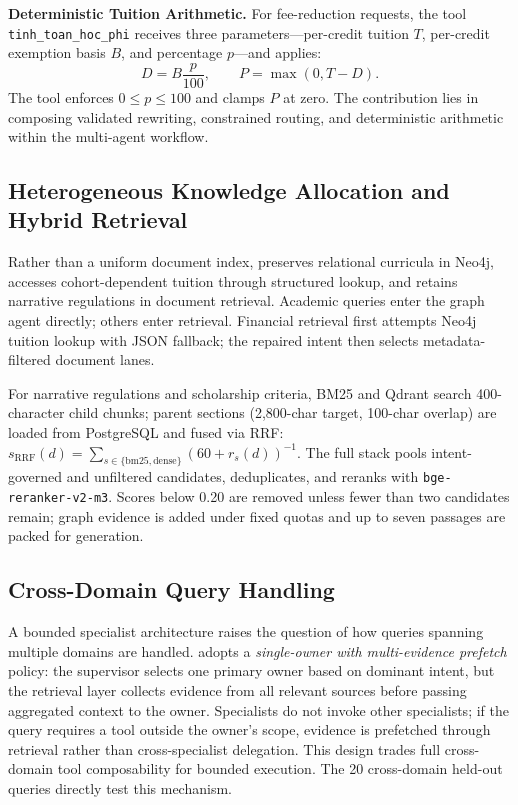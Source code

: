 \textbf{Deterministic Tuition Arithmetic.}
For fee-reduction requests, the tool \texttt{tinh\_}\allowbreak\texttt{toan\_}\allowbreak\texttt{hoc\_}\allowbreak\texttt{phi} receives three parameters---per-credit tuition $T$, per-credit exemption basis $B$, and percentage $p$---and applies:
\begin{equation}
  D = B\frac{p}{100}, \qquad P = \max(0, T-D).
  \label{eq:tuition_reduction}
\end{equation}
The tool enforces $0 \le p \le 100$ and clamps $P$ at zero. The contribution lies in composing validated rewriting, constrained routing, and deterministic arithmetic within the multi-agent workflow.

\subsection{Heterogeneous Knowledge Allocation and Hybrid Retrieval}
\label{sec:hybrid_retrieval}

Rather than a uniform document index, \system{} preserves relational curricula in Neo4j, accesses cohort-dependent tuition through structured lookup, and retains narrative regulations in document retrieval. Academic queries enter the graph agent directly; others enter retrieval. Financial retrieval first attempts Neo4j tuition lookup with JSON fallback; the repaired intent then selects metadata-filtered document lanes.

For narrative regulations and scholarship criteria, BM25 and Qdrant search 400-character child chunks; parent sections (2,800-char target, 100-char overlap) are loaded from PostgreSQL and fused via RRF: $s_{\mathrm{RRF}}(d)=\sum_{s\in\{\mathrm{bm25},\mathrm{dense}\}}(60+r_s(d))^{-1}$. The full stack pools intent-governed and unfiltered candidates, deduplicates, and reranks with \texttt{bge-reranker-v2-m3}. Scores below 0.20 are removed unless fewer than two candidates remain; graph evidence is added under fixed quotas and up to seven passages are packed for generation.

\subsection{Cross-Domain Query Handling}
\label{sec:cross_domain}

A bounded specialist architecture raises the question of how queries spanning multiple domains are handled. \system{} adopts a \emph{single-owner with multi-evidence prefetch} policy: the supervisor selects one primary owner based on dominant intent, but the retrieval layer collects evidence from all relevant sources before passing aggregated context to the owner. Specialists do not invoke other specialists; if the query requires a tool outside the owner's scope, evidence is prefetched through retrieval rather than cross-specialist delegation. This design trades full cross-domain tool composability for bounded execution. The 20 cross-domain held-out queries directly test this mechanism.
